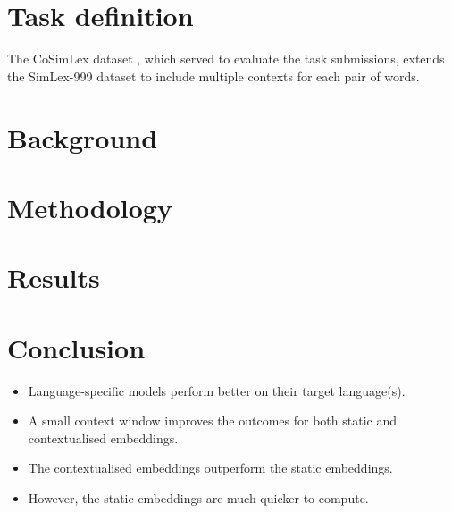 \section{Task definition}

The CoSimLex dataset \parencite{Armendariz2020}, which served to evaluate the task
submissions, extends the SimLex-999 dataset \parencite{Hill2015} to include multiple
contexts for each pair of words.

\section{Background}

\section{Methodology}

\section{Results}

\section{Conclusion}

\begin{itemize}
  \item Language-specific models perform better on their target language(s).
  \item A small context window improves the outcomes for both static and contextualised embeddings.
  \item The contextualised embeddings outperform the static embeddings.
  \item However, the static embeddings are much quicker to compute.
\end{itemize}
